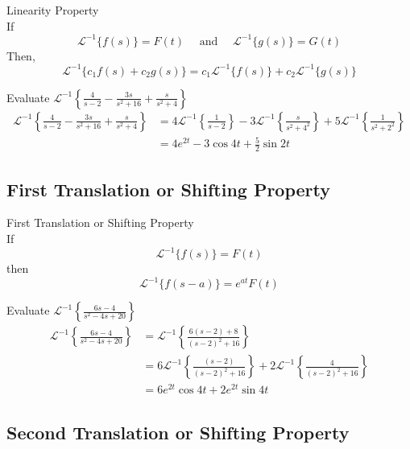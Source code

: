 \documentclass[12pt]{article}
\newcommand{\Lapinv}{\mathscr{L}^{-1}}
\begin{document}
\begin{theorem}{Linearity Property}{}
    \\If \[
        \Lapinv \{ f(s) \} = F(t) \quad \text{ and } \quad
        \Lapinv \{ g(s) \} = G(t)
    \] Then, \[
        \Lapinv \{ c_1f(s) + c_2g(s) \} = c_1 \Lapinv \{ f(s) \} + c_2 \Lapinv \{ g(s) \}
    \]
\end{theorem}

\begin{example}{Evaluate $\Lapinv \left\{ \frac{4}{s-2} - \frac{3s}{s^2+16} + \frac{s}{s^2+4} \right\}$}{}
    \begin{align*}
        \Lapinv \left\{ \frac{4}{s-2} - \frac{3s}{s^2+16} + \frac{s}{s^2+4} \right\} &= 4\Lapinv \left\{ \frac{1}{s-2} \right\} - 3\Lapinv \left\{ \frac{s}{s^2+4^2} \right\} + 5\Lapinv \left\{ \frac{1}{s^2+2^2} \right\} \\
        &= 4e^{2t} - 3\cos{4t} + \frac{5}{2}\sin{2t}
    \end{align*}
\end{example}


\subsection{First Translation or Shifting Property}

\begin{theorem}{First Translation or Shifting Property}{}
    \\If \[
        \Lapinv \{ f(s) \} = F(t)
    \] then \[
        \Lapinv \{ f(s-a) \} = e^{at}F(t)
    \]
\end{theorem}

\begin{example}{Evaluate $\displaystyle \Lapinv \left\{ \frac{6s-4}{s^2-4s+20} \right\}$}{}
    \begin{align*}
        \Lapinv \left\{ \frac{6s-4}{s^2-4s+20} \right\} &= \Lapinv \left\{ \frac{6(s-2)+8}{(s-2)^2+16} \right\} \\
        &= 6\Lapinv \left\{ \frac{(s-2)}{(s-2)^2+16} \right\} + 2\Lapinv \left\{ \frac{4}{(s-2)^2+16} \right\} \\
        &= 6e^{2t}\cos{4t} + 2e^{2t}\sin{4t}
    \end{align*}
\end{example}


\subsection{Second Translation or Shifting Property}
\end{document}
